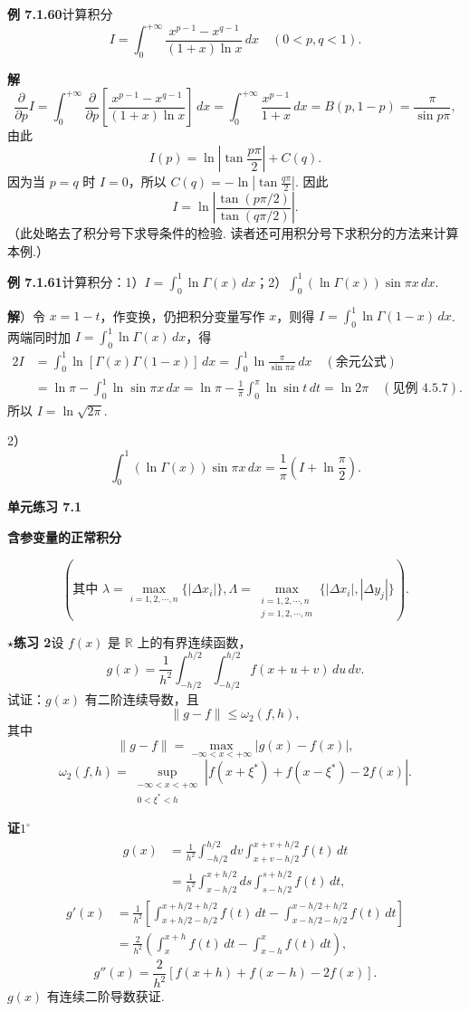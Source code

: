 \documentclass[UTF8, 12pt, fontset=fandol, oneside]{ctexart}
\begin{document}
\noindent\textbf{例 7.1.60}\quad 计算积分
\[
I=\int_0^{+\infty}\frac{x^{p-1}-x^{q-1}}{(1+x)\ln x}\,dx\quad(0<p,q<1).
\]

\noindent\textbf{解}\quad
\[
\frac{\partial}{\partial p}I
=\int_0^{+\infty}\frac{\partial}{\partial p}
\left[\frac{x^{p-1}-x^{q-1}}{(1+x)\ln x}\right]\,dx
=\int_0^{+\infty}\frac{x^{p-1}}{1+x}\,dx
=B(p,1-p)=\frac{\pi}{\sin p\pi},
\]
由此
\[
I(p)=\ln\left|\tan\frac{p\pi}{2}\right|+C(q).
\]
因为当 $p=q$ 时 $I=0$，所以 $C(q)=-\ln\left|\tan\frac{q\pi}{2}\right|$. 因此
\[
I=\ln\left|\frac{\tan(p\pi/2)}{\tan(q\pi/2)}\right|.
\]
（此处略去了积分号下求导条件的检验. 读者还可用积分号下求积分的方法来计算本例.）

\noindent\textbf{例 7.1.61}\quad 计算积分：1）$I=\displaystyle\int_0^1\ln\Gamma(x)\,dx$；2）$\displaystyle\int_0^1(\ln\Gamma(x))\sin\pi x\,dx$.

\noindent\textbf{解}）令 $x=1-t$，作变换，仍把积分变量写作 $x$，则得 $I=\displaystyle\int_0^1\ln\Gamma(1-x)\,dx$. 两端同时加 $I=\displaystyle\int_0^1\ln\Gamma(x)\,dx$，得
\[
\begin{aligned}
2I&=\int_0^1\ln[\Gamma(x)\Gamma(1-x)]\,dx
=\int_0^1\ln\frac{\pi}{\sin\pi x}\,dx\quad(\text{余元公式})\\
&=\ln\pi-\int_0^1\ln\sin\pi x\,dx
=\ln\pi-\frac1\pi\int_0^\pi\ln\sin t\,dt
=\ln2\pi\quad(\text{见例 4.5.7}).
\end{aligned}
\]
所以 $I=\ln\sqrt{2\pi}$.

2）
\[
\int_0^1(\ln\Gamma(x))\sin\pi x\,dx
=\frac1\pi\left(I+\ln\frac\pi2\right).
\]

\noindent\textbf{单元练习 7.1}

\noindent\textbf{含参变量的正常积分}



\[
\left(\text{其中 }\lambda=\max_{i=1,2,\cdots,n}\{|\Delta x_i|\},
\Lambda=\max_{\substack{i=1,2,\cdots,n\\ j=1,2,\cdots,m}}\{|\Delta x_i|,|\Delta y_j|\}\right).
\]

\noindent\textbf{$\star$练习 2}\quad 设 $f(x)$ 是 $\mathbb R$ 上的有界连续函数，
\[
g(x)=\frac1{h^2}\int_{-h/2}^{h/2}\int_{-h/2}^{h/2}f(x+u+v)\,du\,dv.
\]
试证：$g(x)$ 有二阶连续导数，且
\[
\|g-f\|\le\omega_2(f,h),
\]
其中
\[
\|g-f\|=\max_{-\infty<x<+\infty}|g(x)-f(x)|,
\]
\[
\omega_2(f,h)=\sup_{\substack{-\infty<x<+\infty\\ 0<\xi^*<h}}
|f(x+\xi^*)+f(x-\xi^*)-2f(x)|.
\]

\noindent\textbf{证}\quad $1^\circ$
\[
\begin{aligned}
g(x)&=\frac1{h^2}\int_{-h/2}^{h/2}dv\int_{x+v-h/2}^{x+v+h/2}f(t)\,dt\\
&=\frac1{h^2}\int_{x-h/2}^{x+h/2}ds\int_{s-h/2}^{s+h/2}f(t)\,dt,
\end{aligned}
\]
\[
\begin{aligned}
g'(x)
&=\frac1{h^2}\left[\int_{x+h/2-h/2}^{x+h/2+h/2}f(t)\,dt
-\int_{x-h/2-h/2}^{x-h/2+h/2}f(t)\,dt\right]\\
&=\frac2{h^2}\left(\int_x^{x+h}f(t)\,dt-\int_{x-h}^x f(t)\,dt\right),
\end{aligned}
\]
\[
g''(x)=\frac2{h^2}[f(x+h)+f(x-h)-2f(x)].
\]
$g(x)$ 有连续二阶导数获证.
\end{document}
